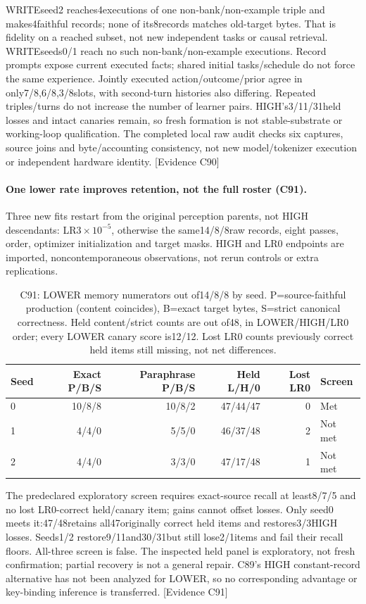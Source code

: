 \documentclass[11pt]{article}
\newcommand{\ev}[1]{\textsf{[Evidence #1]}}
\begin{document}
WRITEseed2 reaches4executions of one non-bank/non-example triple and makes4faithful records;
none of its8records matches old-target bytes. That is fidelity on a reached
subset, not new independent tasks or causal retrieval. WRITEseeds0/1 reach no
such non-bank/non-example executions. Record prompts expose current executed
facts; shared initial tasks/schedule do not force the same experience. Jointly
executed action/outcome/prior agree in only7/8,6/8,3/8slots, with second-turn
histories also differing. Repeated triples/turns do not increase the number of
learner pairs. HIGH's3/11/31held losses and intact canaries remain, so fresh
formation is not stable-substrate or working-loop qualification. The completed
local raw audit checks six captures, source joins and byte/accounting consistency,
not new model/tokenizer execution or independent hardware identity. \ev{C90}

\paragraph{One lower rate improves retention, not the full roster (C91).}
Three new fits restart from the original perception parents, not HIGH descendants:
LR$3\times10^{-5}$, otherwise the same14/8/8raw records, eight passes, order,
optimizer initialization and target masks. HIGH and LR0 endpoints are imported,
noncontemporaneous observations, not rerun controls or extra replications.
\begin{table}[htbp]
\centering\small
\begin{tabular}{lrrrrl}
\toprule
Seed & Exact P/B/S & Paraphrase P/B/S & Held L/H/0 & Lost LR0 & Screen \\
\midrule
0 & 10/8/8 & 10/8/2 & 47/44/47 & 0 & Met \\
1 & 4/4/0 & 5/5/0 & 46/37/48 & 2 & Not met \\
2 & 4/4/0 & 3/3/0 & 47/17/48 & 1 & Not met \\
\bottomrule
\end{tabular}
\caption{C91: LOWER memory numerators out of14/8/8 by seed.
P=source-faithful production (content coincides), B=exact target bytes,
S=strict canonical correctness. Held content/strict counts are out of48,
in LOWER/HIGH/LR0 order; every LOWER canary score is12/12. Lost LR0 counts
previously correct held items still missing, not net differences.}
\label{tab:seq155-repair}
\end{table}
The predeclared exploratory screen requires exact-source recall at least8/7/5
and no lost LR0-correct held/canary item; gains cannot offset losses. Only seed0
meets it:47/48retains all47originally correct held items and restores3/3HIGH
losses. Seeds1/2 restore9/11and30/31but still lose2/1items and fail their recall
floors. All-three screen is false. The inspected held panel is exploratory,
not fresh confirmation; partial recovery is not a general repair. C89's
HIGH constant-record alternative has not been analyzed for LOWER, so no
corresponding advantage or key-binding inference is transferred. \ev{C91}
\end{document}
